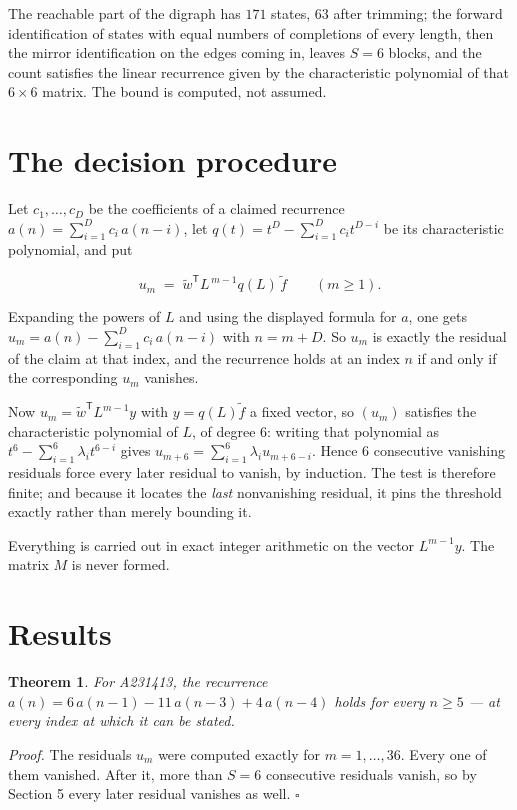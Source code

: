 \documentclass[11pt]{article}
\newtheorem{theorem}{Theorem}
\theoremstyle{definition}
\begin{document}
The reachable part of the digraph has $171$ states, $63$ after trimming; the forward identification of states with equal numbers of completions of every length, then the mirror identification on the edges coming in, leaves $S = 6$ blocks, and the count satisfies the linear recurrence given by the characteristic polynomial of that $6\times6$ matrix. The bound is computed, not assumed.

\section{The decision procedure}

Let $c_1,\dots,c_D$ be the coefficients of a claimed recurrence $a(n) = \sum_{i=1}^{D} c_i\,a(n-i)$, let $q(t) = t^{D} - \sum_{i=1}^{D} c_i t^{D-i}$ be its characteristic polynomial, and put

\[u_m \;=\; \tilde w^{\mathsf T} L^{\,m-1} q(L)\,\tilde f \qquad (m \ge 1).\]

Expanding the powers of $L$ and using the displayed formula for $a$, one gets $u_m = a(n) - \sum_{i=1}^{D} c_i\,a(n-i)$ with $n = m + D$. So $u_m$ is exactly the residual of the claim at that index, and the recurrence holds at an index $n$ if and only if the corresponding $u_m$ vanishes.

Now $u_m = \tilde w^{\mathsf T} L^{m-1} y$ with $y = q(L)\tilde f$ a fixed vector, so $(u_m)$ satisfies the characteristic polynomial of $L$, of degree $6$: writing that polynomial as $t^{6} - \sum_{i=1}^{6} \lambda_i t^{6-i}$ gives $u_{m+6} = \sum_{i=1}^{6} \lambda_i u_{m+6-i}$. Hence $6$ consecutive vanishing residuals force every later residual to vanish, by induction. The test is therefore finite; and because it locates the {\itshape last} nonvanishing residual, it pins the threshold exactly rather than merely bounding it.

Everything is carried out in exact integer arithmetic on the vector $L^{m-1}y$. The matrix $M$ is never formed.

\section{Results}

\begin{theorem} For A231413, the recurrence $a(n) = 6\,a(n-1) - 11\,a(n-3) + 4\,a(n-4)$ holds for every $n \ge 5$ --- at every index at which it can be stated.\end{theorem}

{\itshape Proof.} The residuals $u_m$ were computed exactly for $m = 1,\dots,36$. Every one of them vanished. After it, more than $S = 6$ consecutive residuals vanish, so by Section 5 every later residual vanishes as well. $\square$
\end{document}
